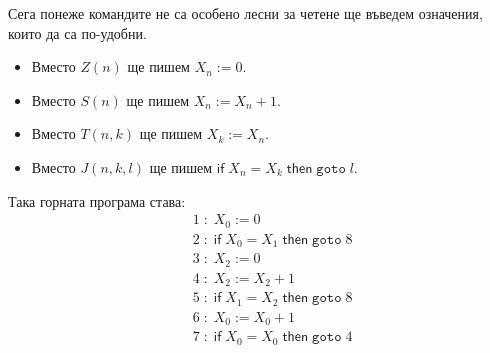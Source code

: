 \documentclass[14pt]{extarticle}
\begin{document}
Сега понеже командите не са особено лесни за четене ще въведем означения, които да са по-удобни.
\begin{itemize}
    \item  Вместо \(Z(n)\) ще пишем \(X_n := 0\).
    \item Вместо \(S(n)\) ще пишем \(X_n := X_n + 1\).
    \item Вместо \(T(n, k)\) ще пишем \(X_k := X_n\).
    \item Вместо \(J(n, k, l)\) ще пишем \(\mathsf{if} \; X_n = X_k \; \mathsf{then} \; \mathtt{goto} \; l\).
\end{itemize}
Така горната програма става:
\begin{align*}
    & \quad 1 \; : \; X_0 := 0 \\
    & \quad 2 \; : \; \mathsf{if} \; X_0 = X_1 \; \mathsf{then} \; \mathtt{goto} \; 8 \\
    & \quad 3 \; : \; X_2 := 0 \\
    & \quad 4 \; : \; X_2 := X_2 + 1 \\
    & \quad 5 \; : \; \mathsf{if} \;  X_1 = X_2 \; \mathsf{then} \; \mathtt{goto} \; 8 \\
    & \quad 6 \; : \; X_0 := X_0 + 1\\
    & \quad 7 \; : \; \mathsf{if} \; X_0 = X_0 \; \mathsf{then} \; \mathtt{goto} \; 4
\end{align*}
\end{document}
